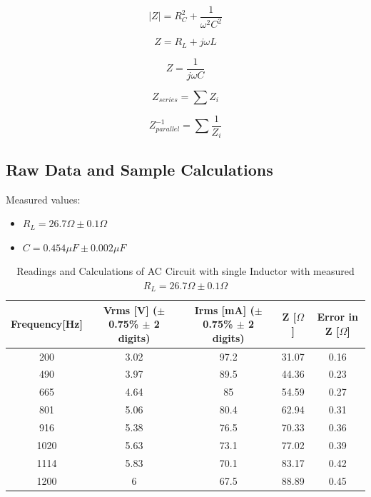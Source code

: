 \documentclass[]{article}
\newcommand{\getMeasuredC}{$C = 0.454 \mu F \pm 0.002 \mu F $}
\newcommand{\getMeasuredR}{$R_{L} = 26.7 \Omega \pm 0.1 \Omega $}
\begin{document}
\begin{equation} \label{eq3}
    |Z| = R_{C}^2 + \frac{1} {\omega^2C^2}
\end{equation}

\begin{equation} \label{eq5}
    Z = R_{L} + j\omega L
\end{equation}

\begin{equation} \label{eq6}
    Z = \frac{1}{j\omega C}
\end{equation}

\begin{equation} \label{eq7}
    Z_{series} = \sum Z_i
\end{equation}

\begin{equation} \label{eq8}
    Z_{parallel}^{-1} = \sum \frac{1}{Z_i}
\end{equation}

\subsection*{Raw Data and Sample Calculations}
Measured values:
\begin{itemize}
    \item \getMeasuredR\
    \item \getMeasuredC\
\end{itemize}

\begin{table}[!htb]
    \caption{Readings and Calculations of AC Circuit with single Inductor with
    measured \getMeasuredR}\label{tab:ind}
    \begin{tabulary}{\textwidth}{CCCCC}
        Frequency[Hz]&Vrms [V] ($\pm$ 0.75\% $\pm$ 2 digits)&Irms [mA] ($\pm$
        0.75\% $\pm$ 2 digits)&Z [$\Omega$]&Error in Z [$\Omega$]\\
        \hline
        200                & 3.02         & 97.2          & 31.07        & 0.16                  \\
        490                & 3.97         & 89.5          & 44.36        & 0.23                  \\
        665                & 4.64         & 85            & 54.59        & 0.27                  \\
        801                & 5.06         & 80.4          & 62.94        & 0.31                  \\
        916                & 5.38         & 76.5          & 70.33        & 0.36                  \\
        1020               & 5.63         & 73.1          & 77.02        & 0.39                  \\
        1114               & 5.83         & 70.1          & 83.17        & 0.42                  \\
        1200               & 6            & 67.5          & 88.89        & 0.45 \\
    \end{tabulary}
\end{table}
\end{document}
